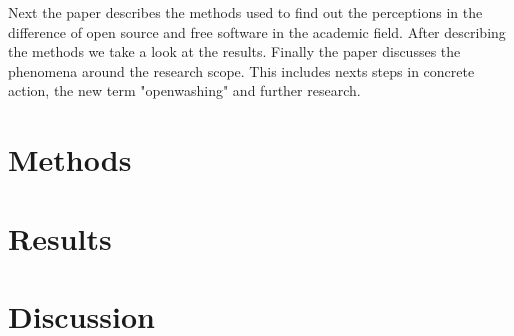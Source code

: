 \documentclass[conference]{IEEEtran}
\begin{document}
Next the paper describes the methods used to find out the perceptions in the difference of open source and free software in the academic field. After describing the methods we take a look at the results. Finally the paper discusses the phenomena around the research scope. This includes nexts steps in concrete action, the new term "openwashing" and further research.

\section{Methods}

\section{Results}

\section{Discussion}


{}
\end{document}
